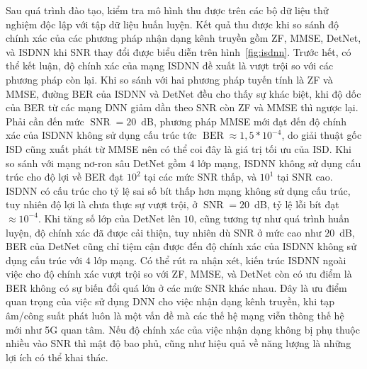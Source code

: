 Sau quá trình đào tạo, kiểm tra mô hình thu được trên các bộ dữ liệu thử nghiệm độc lập với tập dữ liệu huấn luyện. Kết quả thu được khi so sánh độ chính xác của các phương pháp nhận dạng kênh truyền gồm ZF, MMSE, DetNet, và ISDNN khi SNR thay đổi được biểu diễn trên hình~\ref{fig:isdnn}. Trước hết, có thể kết luận, độ chính xác của mạng ISDNN đề xuất là vượt trội so với các phương pháp còn lại. Khi so sánh với hai phương pháp tuyến tính là ZF và MMSE, đường BER của ISDNN và DetNet đều cho thấy sự khác biệt, khi độ dốc của BER từ các mạng DNN giảm dần theo SNR còn ZF và MMSE thì ngược lại. Phải cần đến mức $\operatorname{SNR}=20$~dB, phương pháp MMSE mới đạt đến độ chính xác của ISDNN không sử dụng cấu trúc tức $\operatorname{BER}\approx 1,5* 10^{-4}$, do giải thuật gốc ISD cũng xuất phát từ MMSE nên có thể coi đây là giá trị tối ưu của ISD. Khi so sánh với mạng nơ-ron sâu DetNet gồm $4$ lớp mạng, ISDNN không sử dụng cấu trúc cho độ lợi về BER đạt $10^2$ tại các mức SNR thấp, và $10^1$ tại SNR cao. ISDNN có cấu trúc cho tỷ lệ sai số bít thấp hơn mạng không sử dụng cấu trúc, tuy nhiên độ lợi là chưa thực sự vượt trội, ở $\operatorname{SNR}=20$~dB, tỷ lệ lỗi bít đạt $\approx 10^{-4}$. Khi tăng số lớp của DetNet lên $10$, cũng tương tự như quá trình huấn luyện, độ chính xác đã được cải thiện, tuy nhiên dù SNR ở mức cao như $20$~dB, BER của DetNet cũng chỉ tiệm cận được đến độ chính xác của ISDNN không sử dụng cấu trúc với $4$ lớp mạng.
Có thể rút ra nhận xét, kiến trúc ISDNN ngoài việc cho độ chính xác vượt trội so với ZF, MMSE, và DetNet còn có ưu điểm là BER không có sự biến đổi quá lớn ở các mức SNR khác nhau. Đây là ưu điểm quan trọng của việc sử dụng DNN cho việc nhận dạng kênh truyền, khi tạp âm/công suất phát luôn là một vấn đề mà các thế hệ mạng viễn thông thế hệ mới như 5G quan tâm. Nếu độ chính xác của việc nhận dạng không bị phụ thuộc nhiều vào SNR thì mật độ bao phủ, cũng như hiệu quả về năng lượng là những lợi ích có thể khai thác.


